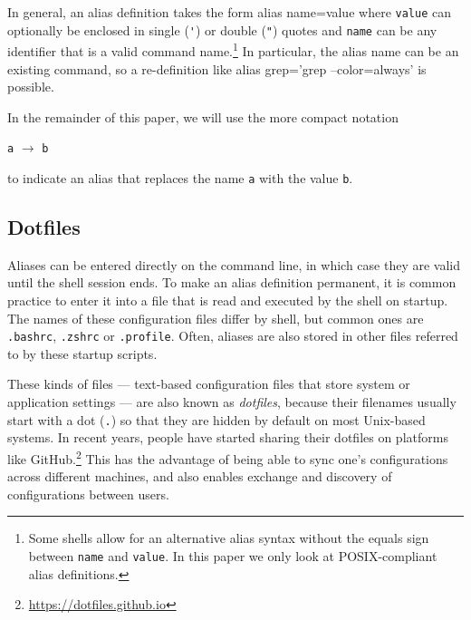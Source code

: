 \documentclass[smallextended,natbib]{svjour3}
\newenvironment{CVerbatim}
  {\center\BVerbatim}
  {\endBVerbatim\endcenter}
\newcommand{\alias}[2]{{\texttt{#1} $\rightarrow$ \texttt{#2}}}
\begin{document}


In general, an alias definition takes the form
\begin{CVerbatim}
alias name=value
\end{CVerbatim}
where \verb|value| can optionally be enclosed in single (\verb|'|) or double (\verb|"|) quotes and \verb|name| can be any identifier that is a valid command name.\footnote{Some shells allow for an alternative alias syntax without the equals sign between \texttt{name} and \texttt{value}. In this paper we only look at POSIX-compliant alias definitions.}
In particular, the alias name can be an existing command, so a re-definition like
\begin{CVerbatim}
alias grep='grep --color=always'
\end{CVerbatim}
is possible.

In the remainder of this paper, we will use the more compact notation
\begin{center}\alias{a}{b}\end{center} to indicate an alias that replaces the name \texttt{a} with the value \texttt{b}.

\subsection{Dotfiles}

Aliases can be entered directly on the command line, in which case they are valid until the shell session ends.
To make an alias definition permanent, it is common practice to enter it into a file that is read and executed by the shell on startup.
The names of these configuration files differ by shell, but common ones are \verb|.bashrc|, \verb|.zshrc| or \verb|.profile|.
Often, aliases are also stored in other files referred to by these startup scripts.

These kinds of files --- text-based configuration files that store system or application settings --- are also known as \emph{dotfiles}, because their filenames usually start with a dot (\verb|.|) so that they are hidden by default on most Unix-based systems.
In recent years, people have started sharing their dotfiles on platforms like GitHub.\footnote{\url{https://dotfiles.github.io}}
This has the advantage of being able to sync one's configurations across different machines, and also enables exchange and discovery of configurations between users.
\end{document}
